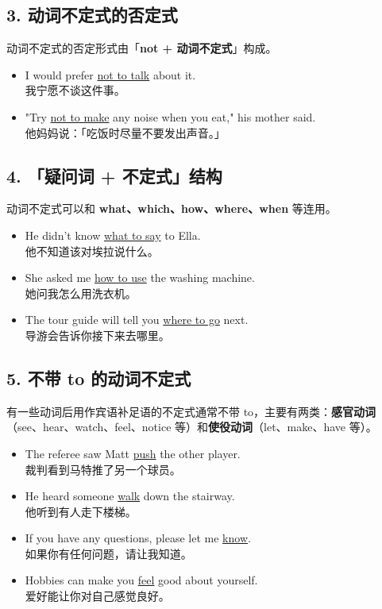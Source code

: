 \documentclass[11pt,a4paper]{ctexart}
\begin{document}
\subsection*{3. 动词不定式的否定式}

动词不定式的否定形式由「\textbf{not + 动词不定式}」构成。

\begin{itemize}[leftmargin=1.4em]
\item I would prefer \underline{not to talk} about it.\\ 我宁愿不谈这件事。
\item "Try \underline{not to make} any noise when you eat," his mother said.\\ 他妈妈说：「吃饭时尽量不要发出声音。」
\end{itemize}

\subsection*{4. 「疑问词 + 不定式」结构}

动词不定式可以和 \textbf{what、which、how、where、when} 等连用。

\begin{itemize}[leftmargin=1.4em]
\item He didn’t know \underline{what to say} to Ella.\\ 他不知道该对埃拉说什么。
\item She asked me \underline{how to use} the washing machine.\\ 她问我怎么用洗衣机。
\item The tour guide will tell you \underline{where to go} next.\\ 导游会告诉你接下来去哪里。
\end{itemize}

\subsection*{5. 不带 to 的动词不定式}

有一些动词后用作宾语补足语的不定式通常不带 to，主要有两类：\textbf{感官动词}（see、hear、watch、feel、notice 等）和\textbf{使役动词}（let、make、have 等）。

\begin{itemize}[leftmargin=1.4em]
\item The referee saw Matt \underline{push} the other player.\\ 裁判看到马特推了另一个球员。
\item He heard someone \underline{walk} down the stairway.\\ 他听到有人走下楼梯。
\item If you have any questions, please let me \underline{know}.\\ 如果你有任何问题，请让我知道。
\item Hobbies can make you \underline{feel} good about yourself.\\ 爱好能让你对自己感觉良好。
\end{itemize}
\end{document}
